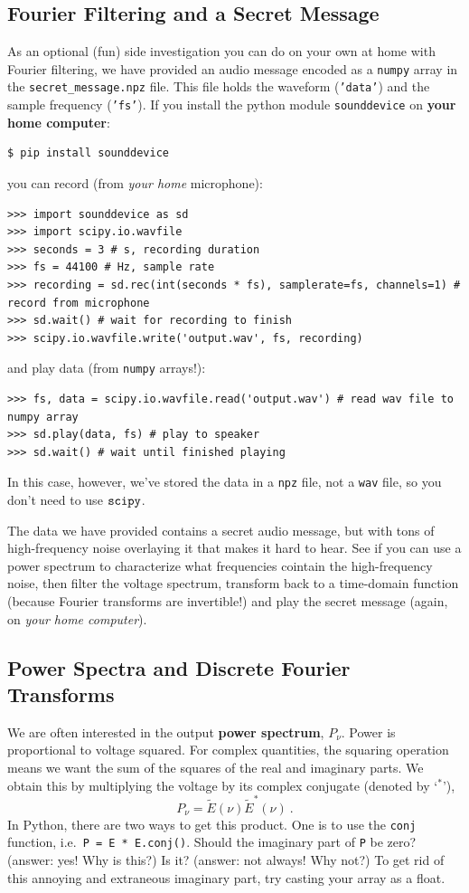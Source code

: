 \documentclass[11pt,preprint]{aastex}
\begin{document}
{\color{red}
\subsection{Fourier Filtering and a Secret Message}

As an optional (fun) side investigation you can do on your own at
home 
with Fourier filtering, we have provided an audio message encoded as a {\tt numpy} array in the 
{\tt secret\_message.npz} file. This file holds the waveform ({\tt 'data'}) and the sample
frequency ({\tt 'fs'}). If you install the python module {\tt sounddevice} on {\bf your home computer}:
\begin{verbatim}
$ pip install sounddevice
\end{verbatim}
you can record (from {\it your home} microphone):
\begin{verbatim}
>>> import sounddevice as sd
>>> import scipy.io.wavfile
>>> seconds = 3 # s, recording duration
>>> fs = 44100 # Hz, sample rate
>>> recording = sd.rec(int(seconds * fs), samplerate=fs, channels=1) # record from microphone
>>> sd.wait() # wait for recording to finish
>>> scipy.io.wavfile.write('output.wav', fs, recording)
\end{verbatim}
and play data (from {\tt numpy} arrays!):
\begin{verbatim}
>>> fs, data = scipy.io.wavfile.read('output.wav') # read wav file to numpy array
>>> sd.play(data, fs) # play to speaker
>>> sd.wait() # wait until finished playing
\end{verbatim}
In this case, however, we've stored the data in a {\tt npz} file, not a {\tt wav} file, so you
don't need to use $\tt scipy$.

The data we have provided contains a secret audio message, but with tons of high-frequency noise
overlaying it that makes it hard to hear. See if you can use a power spectrum to characterize
what frequencies cointain the high-frequency noise, then filter the voltage spectrum, transform
back to a time-domain function (because Fourier transforms are invertible!) and play the secret
message (again, on {\it your home computer}).}


\subsection{Power Spectra and Discrete Fourier Transforms} 
\label{pwrspect}

\noindent
We are often interested in the output {\bf power spectrum}, 
$P_\nu$.  Power is proportional to voltage squared.  For complex quantities, the squaring
operation means we want the sum of the squares of the real and imaginary
parts.  We obtain this by multiplying the voltage by its complex
conjugate (denoted by `$^*$'),
%
\begin{equation}
P_\nu = \tilde E(\nu) \tilde E^*(\nu) \ .
\end{equation}
% 
\noindent In Python, there are two ways to get this product.  One is to use
the \verb$conj$ function, i.e.\ {\tt P = E * E.conj()}.  Should the
imaginary part of \verb$P$ be zero? (answer: yes! Why is this?) Is it?
(answer: not always! Why not?) To get rid of this annoying and extraneous
imaginary part, try casting your array as a float.
 
\end{document}
